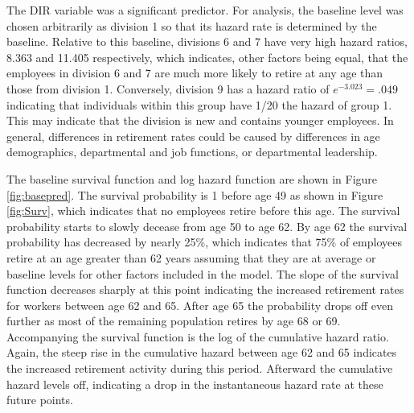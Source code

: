 \documentclass[12pt,letterpaper]{article}
\begin{document}
The DIR variable was a significant predictor.  For analysis, the baseline level was chosen arbitrarily as division 1 so that its hazard rate is determined by the baseline.  Relative to this baseline, divisions 6 and 7 have very high hazard ratios, 8.363 and 11.405 respectively, which indicates, other factors being equal, that the employees in division 6 and 7 are much more likely to retire at any age than those from division 1.  Conversely, division 9 has a hazard ratio of $e^{-3.023} = .049$ indicating that individuals within this group have 1/20 the hazard of group 1.  This may indicate that the division is new and contains younger employees.  In general, differences in retirement rates could be caused by differences in age demographics, departmental and job functions, or departmental leadership.

The baseline survival function and log hazard function are shown in Figure \ref{fig:basepred}. The survival probability is 1 before age 49 as shown in Figure \ref{fig:Surv}, which indicates that no employees retire before this age. The survival probability starts to slowly decease from age 50 to age 62. By age 62 the survival probability has decreased by nearly 25\%, which indicates that 75\% of employees retire at an age greater than 62 years assuming that they are at average or baseline levels for other factors included in the model.  The slope of the survival function decreases sharply at this point indicating the increased retirement rates for workers between age 62 and 65.  After age 65 the probability drops off even further as most of the remaining population retires by age 68 or 69. Accompanying the survival function is the log of the cumulative hazard ratio.  Again, the steep rise in the cumulative hazard between age 62 and 65 indicates the increased retirement activity during this period.  Afterward the cumulative hazard levels off, indicating a drop in the instantaneous hazard rate at these future points.
\end{document}
